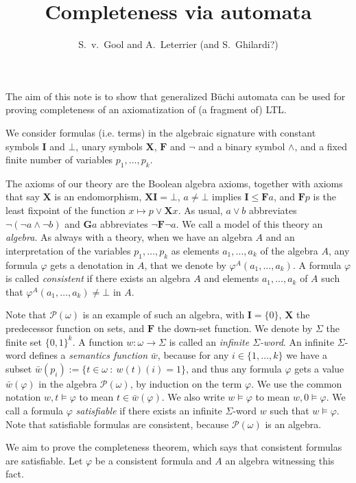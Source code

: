 \documentclass{article}
\title{Completeness via automata}
\author{S.~v.~Gool and A.~Leterrier (and S.~Ghilardi?)}
\newcommand{\X}{\mathbf{X}}
\newcommand{\F}{\mathbf{F}}
\newcommand{\G}{\mathbf{G}}
\newcommand{\I}{\mathbf{I}}
\renewcommand{\phi}{\varphi}
\begin{document}
\maketitle
The aim of this note is to show that generalized Büchi automata can be used for
proving completeness of an axiomatization of (a fragment of) LTL.

We consider formulas (i.e. terms) in the algebraic signature with constant
symbols $\I$ and $\bot$, unary symbols $\X$, $\F$ and $\neg$ and a binary symbol
$\wedge$, and a fixed finite number of variables $p_1, \dots, p_k$. 

The axioms of our theory are the Boolean algebra axioms, together with axioms
that say $\X$ is an endomorphism, $\X\I = \bot$, $a \neq \bot$ implies $\I \leq
\F a$, and $\F p$ is the least fixpoint of the function $x \mapsto p \vee \X x$.
As usual, $a \vee b$ abbreviates $\neg (\neg a \wedge \neg b)$ and $\G a$
abbreviates $\neg \F \neg a$. We call a model of this theory an \emph{algebra}.
As always with a theory, when we have an algebra $A$ and an interpretation of
the variables $p_1, \dots, p_k$ as elements $a_1, \dots, a_k$ of the algebra
$A$, any formula $\phi$ gets a denotation in $A$, that we denote by $\phi^A(a_1,
\dots, a_k)$.  A formula $\phi$ is called \emph{consistent} if there exists an
algebra $A$ and elements $a_1, \dots, a_k$ of $A$ such that $\phi^A(a_1, \dots,
a_k) \neq \bot$ in $A$.

Note that $\mathcal{P}(\omega)$ is an example of such an algebra, with $\I =
\{0\}$, $\X$ the predecessor function on sets, and $\F$ the down-set function.
We denote by $\Sigma$ the finite set $\{0,1\}^k$. A function $w \colon \omega
\to \Sigma$ is called an \emph{infinite $\Sigma$-word}. An infinite
$\Sigma$-word defines a \emph{semantics function} $\bar{w}$, because for any $i
\in \{1, \dots, k\}$ we have a subset $\bar{w}(p_i) := \{t \in \omega \ \colon \
w(t)(i) = 1\}$, and thus any formula $\phi$ gets a value $\bar{w}(\phi)$ in the
algebra $\mathcal{P}(\omega)$, by induction on the term  $\phi$. We use the
common notation $w, t \models \phi$ to mean $t \in \bar{w}(\phi)$. We also write
$w \models \phi$ to mean $w, 0 \models \phi$. We call a formula $\phi$
\emph{satisfiable} if there exists an infinite $\Sigma$-word $w$ such that $w
\models \phi$. Note that satisfiable formulas are consistent, because
$\mathcal{P}(\omega)$ is an algebra.

We aim to prove the completeness theorem, which says that consistent formulas
are satisfiable. Let $\phi$ be a consistent formula and $A$ an algebra
witnessing this fact. 
\end{document}
